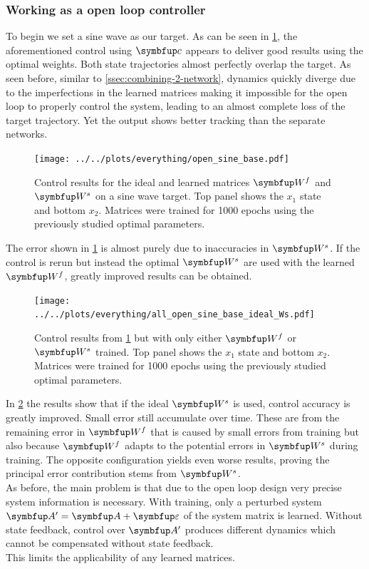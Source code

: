 \subsubsection{Working as a open loop controller}
To begin we set a sine wave as our target. As can be seen in \cref{fig:all_open_sine_base}, the aforementioned control using $\bmu{c}$ appears to deliver good results using the optimal weights. Both state trajectories almost perfectly overlap the target. As seen before, similar to \cref{ssec:combining-2-network}, dynamics quickly diverge due to the imperfections in the learned matrices making it impossible for the open loop to properly control the system, leading to an almost complete loss of the target trajectory. Yet the output shows better tracking than the separate networks.
\begin{figure}
	\centering
	\texttt{[image: ../../plots/everything/open\_sine\_base.pdf]}
	\caption{Control results for the ideal and learned matrices $\bmu{W}^f$ and $\bmu{W}^s$ on a sine wave target. Top panel shows the $x_1$ state and bottom $x_2$. Matrices were trained for 1000 epochs using the previously studied optimal parameters.}
	\label{fig:all_open_sine_base}
\end{figure}
The error shown in \cref{fig:all_open_sine_base} is almost purely due to inaccuracies in $\bmu{W}^s$. If the control is rerun but instead the optimal $\bmu{W}^s$ are used with the learned $\bmu{W}^f$, greatly improved results can be obtained.\\
\begin{figure}
	\centering
	\texttt{[image: ../../plots/everything/all\_open\_sine\_base\_ideal\_Ws.pdf]}
	\caption{Control results from \cref{fig:all_open_sine_base} but with only either $\bmu{W}^f$ or $\bmu{W}^s$ trained. Top panel shows the $x_1$ state and bottom $x_2$. Matrices were trained for 1000 epochs using the previously studied optimal parameters.}
	\label{fig:all_open_sine_base_ideal_Ws}
\end{figure}
In \cref{fig:all_open_sine_base_ideal_Ws} the results show that if the ideal $\bmu{W}^s$ is used, control accuracy is greatly improved. Small error still accumulate over time. These are from the remaining error in $\bmu{W}^f$ that is caused by small errors from training but also because $\bmu{W}^f$ adapts to the potential errors in $\bmu{W}^s$ during training. The opposite configuration yields even worse results, proving the principal error contribution stems from $\bmu{W}^s$.\\
As before, the main problem is that due to the open loop design very precise system information is necessary. With training, only a perturbed system $\bmu{A}' = \bmu{A} + \bmu{\varepsilon}$ of the system matrix is learned. Without state feedback, control over $\bmu{A}'$ produces different dynamics which cannot be compensated without state feedback.\\
This limits the applicability of any learned matrices.
